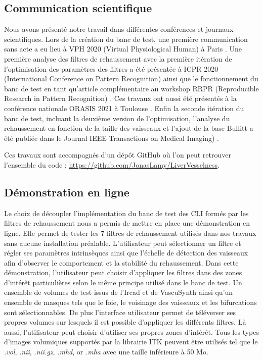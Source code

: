 \subsection{Communication scientifique}
Nous avons présenté notre travail dans différentes conférences et journaux scientifiques. Lors de la création du banc de test, une première communication sans acte a eu lieu à VPH 2020 (Virtual Physiological Human) à Paris \cite{Lamy2020_VPH_bench}. Une première analyse des filtres de rehaussement avec la première itération de l'optimisation des paramètres des filtres a été présentée à ICPR 2020 (International Conference on Pattern Recognition) \cite{Lamy2020_ICPR} ainsi que le fonctionnement du banc de test en tant qu'article complémentaire au workshop RRPR (Reproducible Research in Pattern Recognition) \cite{Lamy2021_RRPR}. Ces travaux ont aussi été présentés à la  conférence nationale ORASIS 2021 à Toulouse \cite{Lamy2021_ORASIS}. Enfin la seconde itération du banc de test, incluant la deuxième version de l'optimisation, l'analyse du rehaussement en fonction de la taille des vaisseaux et l'ajout de la base Bullitt a été publiée dans le Journal IEEE Transactions on Medical Imaging) \cite{Lamy2022_TMI}.

Ces travaux sont accompagnés d'un dépôt GitHub où l'on peut retrouver l'ensemble du code : \url{https://github.com/JonasLamy/LiverVesselness}. 


\subsection{Démonstration en ligne}

Le choix de découpler l'implémentation du banc de test des CLI formés par les filtres de rehaussement nous a permis de mettre en place une démonstration en ligne. Elle permet de tester les 7 filtres de rehaussement utilisés dans nos travaux sans aucune installation préalable. L'utilisateur peut sélectionner un filtre et régler ses paramètres intrinsèques ainsi que l'échelle de détection des vaisseaux afin d'observer le comportement et la stabilité du rehaussement. Dans cette démonstration, l'utilisateur peut choisir d'appliquer les filtres dans des zones d'intérêt particulières selon le même principe utilisé dans le banc de test. Un ensemble de volumes de test issus de l'Ircad et de VascuSynth ainsi qu'un ensemble de masques tels que le foie, le voisinage des vaisseaux et les bifurcations sont sélectionnables. De plus l'interface utilisateur permet de téléverser ses propres volumes sur lesquels il est possible d’appliquer les différents filtres. Là aussi, l'utilisateur peut choisir d'utiliser ses propres zones d'intérêt. Tous les types d'images volumiques supportés par la librairie ITK peuvent être utilisés tel que le \textit{.vol}, \textit{.nii}, \textit{.nii.gz}, \textit{.mhd}, or \textit{.mha} avec une taille inférieure à 50 Mo.

